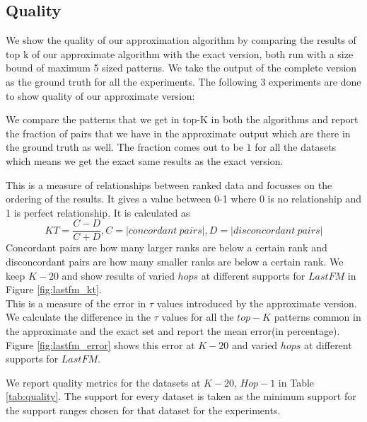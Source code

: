 \subsection{Quality}
We show the quality of our approximation algorithm by comparing the results of top k of our approximate algorithm with the exact version, both run with a size bound of maximum 5 sized patterns. We take the output of the complete version as the ground truth for all the experiments. The following 3 experiments are done to show quality of our approximate version:

 We compare the patterns that we get in top-K in both the algorithms and report the fraction of pairs that we have in the approximate output which are there in the ground truth as well. The fraction comes out to be $1$ for all the datasets which means we get the exact same results as the exact version.

 This is a measure of relationships between ranked data and focusses on the ordering of the results. It gives a value between 0-1 where 0 is no relationship and 1 is perfect relationship. It is calculated as \[KT = \dfrac{C-D}{C+D}, C = |concordant\ pairs|, D = |disconcordant\ pairs|\] Concordant pairs are how many larger ranks are below a certain rank and disconcordant pairs are how many smaller ranks are below a certain rank. We keep $K-20$ and show results of varied $hops$ at different supports for $LastFM$ in Figure \ref{fig:lastfm_kt}.\\ 

 This is a measure of the error in $\tau$ values introduced by the approximate version. We calculate the difference in the $\tau$ values for all the $top-K$ patterns common in the approximate and the exact set and report the mean error(in percentage). Figure \ref{fig:lastfm_error} shows this error at $K-20$ and varied $hops$ at different supports for $LastFM$.

\par We report quality metrics for the datasets at $K-20$, $Hop-1$ in Table \ref{tab:quality}. The support for every dataset is taken as the minimum support for the support ranges chosen for that dataset for the experiments. 

